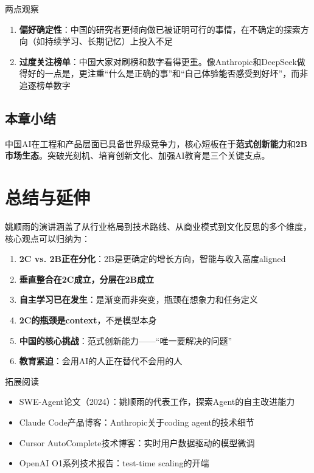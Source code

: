 \documentclass[a4paper]{article}
\begin{document}
\begin{knowledgebox}{两点观察}
\begin{enumerate}
\item \textbf{偏好确定性}：中国的研究者更倾向做已被证明可行的事情，在不确定的探索方向（如持续学习、长期记忆）上投入不足
\item \textbf{过度关注榜单}：中国大家对刷榜和数字看得更重。像Anthropic和DeepSeek做得好的一点是，更注重``什么是正确的事''和``自己体验能否感受到好坏''，而非追逐榜单数字
\end{enumerate}
\end{knowledgebox}

\subsection{本章小结}

中国AI在工程和产品层面已具备世界级竞争力，核心短板在于\textbf{范式创新能力}和\textbf{2B市场生态}。突破光刻机、培育创新文化、加强AI教育是三个关键支点。


\section{总结与延伸}

姚顺雨的演讲涵盖了从行业格局到技术路线、从商业模式到文化反思的多个维度，核心观点可以归纳为：

\begin{enumerate}
\item \textbf{2C vs. 2B正在分化}：2B是更确定的增长方向，智能与收入高度aligned
\item \textbf{垂直整合在2C成立，分层在2B成立}
\item \textbf{自主学习已在发生}：是渐变而非突变，瓶颈在想象力和任务定义
\item \textbf{2C的瓶颈是context}，不是模型本身
\item \textbf{中国的核心挑战}：范式创新能力——``唯一要解决的问题''
\item \textbf{教育紧迫}：会用AI的人正在替代不会用的人
\end{enumerate}

\begin{knowledgebox}{拓展阅读}
\begin{itemize}
\item SWE-Agent论文（2024）：姚顺雨的代表工作，探索Agent的自主改进能力
\item Claude Code产品博客：Anthropic关于coding agent的技术细节
\item Cursor AutoComplete技术博客：实时用户数据驱动的模型微调
\item OpenAI O1系列技术报告：test-time scaling的开端
\end{itemize}
\end{knowledgebox}

\end{document}
